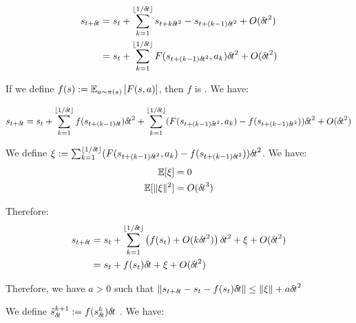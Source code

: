 
\begin{align}
  s_{t + {\delta\hspace{-.1em}t}} &= s_t + \sum_{k=1}^{\lfloor 1/{\delta\hspace{-.1em}t}\rfloor} s_{t+k{\delta\hspace{-.1em}t}^2} -  s_{t+(k-1){\delta\hspace{-.1em}t}^2} + O({\delta\hspace{-.1em}t}^2) \\
                    &= s_t + \sum_{k=1}^{\lfloor 1/{\delta\hspace{-.1em}t} \rfloor} F(s_{t+(k-1){\delta\hspace{-.1em}t}^2}, a_k){\delta\hspace{-.1em}t}^2 + O({\delta\hspace{-.1em}t}^2)
\end{align}

If we define $f(s) \mathrel{\mathop{:}}= \mathbb{E}_{a \sim \pi(s)}\left[F(s, a)\right]$, then $f$ is . We have: 

  \begin{align}
    s_{t + {\delta\hspace{-.1em}t}}   & = s_t + \sum_{k=1}^{\lfloor 1/{\delta\hspace{-.1em}t}\rfloor} f(s_{t+(k-1){\delta\hspace{-.1em}t}}){\delta\hspace{-.1em}t}^2 + \sum_{k=1}^{\lfloor 1/{\delta\hspace{-.1em}t}\rfloor} (F(s_{t+(k-1){\delta\hspace{-.1em}t}^2}, a_k) - f(s_{t+(k-1){\delta\hspace{-.1em}t}^2})){\delta\hspace{-.1em}t}^2 + O({\delta\hspace{-.1em}t}^2)        \\
  \end{align}

  We define $\xi \mathrel{\mathop{:}}= \sum_{k=1}^{\lfloor 1/{\delta\hspace{-.1em}t}\rfloor} (F(s_{t+(k-1){\delta\hspace{-.1em}t}^2}, a_k) - f(s_{t+(k-1){\delta\hspace{-.1em}t}^2})){\delta\hspace{-.1em}t}^2$. We have:
  \begin{align}
    \mathbb{E}[\xi] &= 0 \\
    \mathbb{E}[\|\xi\|^2] &= O({\delta\hspace{-.1em}t}^3)
  \end{align}

  Therefore:
  \begin{align}
  s_{t + {\delta\hspace{-.1em}t}}  &= s_t + \sum_{k=1}^{\lfloor 1/{\delta\hspace{-.1em}t}\rfloor} \left(f(s_{t}) + O(k{\delta\hspace{-.1em}t}^2)\right){\delta\hspace{-.1em}t}^2 + \xi + O({\delta\hspace{-.1em}t}^2) \\
                      & = s_t + f(s_{t}) {\delta\hspace{-.1em}t} + \xi + O({\delta\hspace{-.1em}t}^2) 
  \end{align}

  Therefore, we have $a>0$ such that $\|s_{t + {\delta\hspace{-.1em}t}} - s_t - f(s_t){\delta\hspace{-.1em}t}\| \leq \|\xi\| + a{\delta\hspace{-.1em}t}^2$
  
We define $\tilde s_{\delta\hspace{-.1em}t}^{k+1} \mathrel{\mathop{:}}= f(s_{\delta\hspace{-.1em}t}^k){\delta\hspace{-.1em}t}$
. We have:

